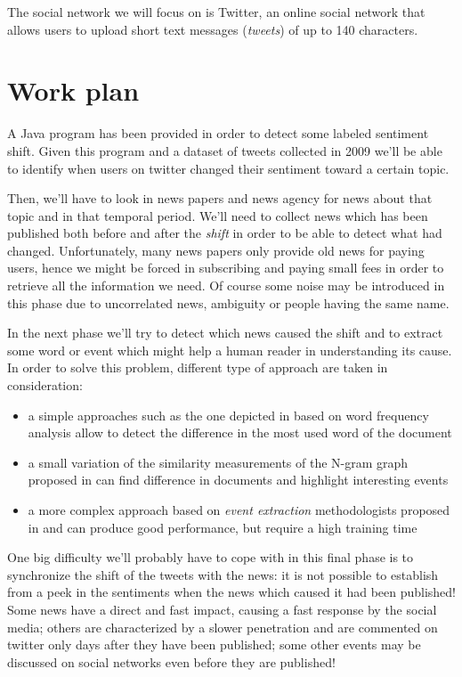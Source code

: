 \documentclass[a4paper]{article}
\begin{document}
The social network we will focus on is Twitter, an online social network that
allows users to upload short text messages (\emph{tweets}) of up to 140 characters.

\section{Work plan}
A Java program has been provided in order to detect some labeled sentiment
shift. Given this program and a dataset of tweets collected in 2009 we'll be
able to identify when users on twitter changed their sentiment toward a certain
topic.

Then, we'll have to look in news papers and news agency for news about that
topic and in that temporal period. We'll need to collect news which has been
published both before and after the \emph{shift} in order to be able to detect
what had changed. 
Unfortunately, many news papers only provide old news for
paying users, hence we might be forced in subscribing and paying small fees in
order to retrieve all the information we need. 
Of course some noise may be introduced in this phase due to uncorrelated news,
ambiguity or people having the same name.

In the next phase we'll try to detect which news caused the shift and to extract
some word or event which might help a human reader in understanding its cause. In order to solve this problem, different type of approach are taken in consideration:
\begin{itemize}
\item a simple approaches such as the one depicted in \cite{Bifet} based on word frequency analysis allow to detect the difference in the most used word of the document
\item a small variation of the similarity measurements of the N-gram graph proposed in \cite{Giannakopoulos} can find difference in documents and highlight interesting events
\item a more complex approach based on \emph{event extraction} methodologists proposed in \cite{Tanev} and \cite{Naughton} can produce good performance, but require a high training time
\end{itemize}


One big difficulty we'll probably have to cope with in this final phase is to
synchronize the shift of the tweets with the news: it is not possible to
establish from a peek in the sentiments when the news which caused it had been
published! Some news have a direct and fast impact, causing a fast
response by the social media; others are characterized by a slower penetration
and are commented on twitter only days after they have been published; some
other events may be discussed on social networks even before they are
published!
\end{document}
